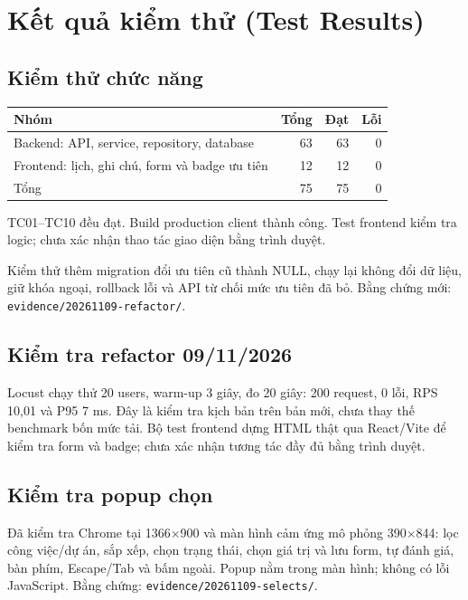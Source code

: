 \section{Kết quả kiểm thử (Test Results)}

\subsection{Kiểm thử chức năng}
\begin{center}
\begin{tabular}{@{}lrrr@{}}
\toprule
\textbf{Nhóm} & \textbf{Tổng} & \textbf{Đạt} & \textbf{Lỗi} \\
\midrule
Backend: API, service, repository, database & 63 & 63 & 0 \\
Frontend: lịch, ghi chú, form và badge ưu tiên & 12 & 12 & 0 \\
\midrule
Tổng & 75 & 75 & 0 \\
\bottomrule
\end{tabular}
\end{center}
TC01--TC10 đều đạt. Build production client thành công.
Test frontend kiểm tra logic; chưa xác nhận thao tác giao diện bằng trình duyệt.


Kiểm thử thêm migration đổi ưu tiên cũ thành NULL, chạy lại không đổi dữ liệu,
giữ khóa ngoại, rollback lỗi và API từ chối mức ưu tiên đã bỏ.
Bằng chứng mới: \texttt{evidence/20261109-refactor/}.

\subsection{Kiểm tra refactor 09/11/2026}
Locust chạy thử 20 users, warm-up 3 giây, đo 20 giây: 200 request, 0 lỗi,
RPS 10,01 và P95 7 ms. Đây là kiểm tra kịch bản trên bản mới, chưa thay thế benchmark bốn mức tải.
Bộ test frontend dựng HTML thật qua React/Vite để kiểm tra form và badge;
chưa xác nhận tương tác đầy đủ bằng trình duyệt.



\subsection{Kiểm tra popup chọn}
Đã kiểm tra Chrome tại 1366$\times$900 và màn hình cảm ứng mô phỏng
390$\times$844: lọc công việc/dự án, sắp xếp, chọn trạng thái,
chọn giá trị và lưu form, tự đánh giá, bàn phím, Escape/Tab và bấm ngoài.
Popup nằm trong màn hình; không có lỗi JavaScript.
Bằng chứng: \texttt{evidence/20261109-selects/}.

